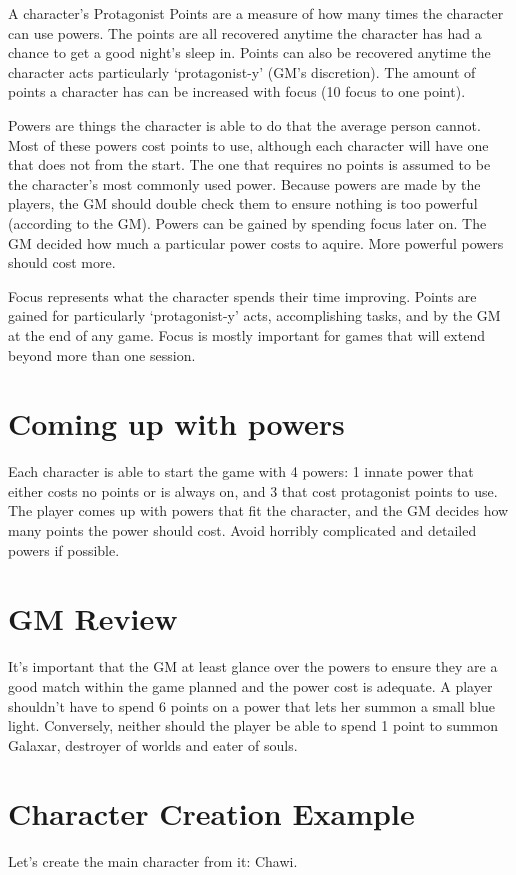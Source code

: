 \begin{flushleft}
A character's Protagonist Points are a measure of how many times the character
can use powers. The points are all recovered anytime the character has had a
chance to get a good night's sleep in. Points can also be recovered anytime
the character acts particularly `protagonist-y' (GM's discretion). The amount
of points a character has can be increased with focus (10 focus to one point).

Powers are things the character is able to do that the average person cannot.
Most of these powers cost points to use, although each character will have
one that does not from the start. The one that requires no points is assumed
to be the character's most commonly used power. Because powers are made by the
players, the GM should double check them to ensure nothing is too powerful
(according to the GM). Powers can be gained by spending focus later on. The GM
decided how much a particular power costs to aquire. More powerful powers
should cost more.

Focus represents what the character spends their time improving. Points are
gained for particularly `protagonist-y' acts, accomplishing tasks, and by
the GM at the end of any game. Focus is mostly important for games that will
extend beyond more than one session.

\section*{Coming up with powers}

Each character is able to start the game with 4 powers: 1 innate power that
either costs no points or is always on, and 3 that cost protagonist points to
use. The player comes up with powers that fit the character, and the GM
decides how many points the power should cost. Avoid horribly complicated and
detailed powers if possible.

\section*{GM Review}
It's important that the GM at least glance over the powers to ensure they are
a good match within the game planned and the power cost is adequate. A player
shouldn't have to spend 6 points on a power that lets her summon a small blue
light. Conversely, neither should the player be able to spend 1 point to
summon Galaxar, destroyer of worlds and eater of souls.

\section*{Character Creation Example}

Let's create the main character from it: Chawi.




\end{flushleft}
